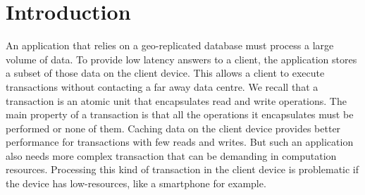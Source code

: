 \documentclass[11pt]{article}
\begin{document}









\newpage
\tableofcontents
\newpage

\section{Introduction}

An application that relies on a geo-replicated database must process a large
volume of data. To provide low latency answers to a client, the application
stores a subset of those data on the client device. This allows a client to
execute transactions without contacting a far away data centre. We recall that
a transaction is an atomic unit that encapsulates read and write operations.
The main property of a transaction is that all the operations it encapsulates
must be performed or none of them. Caching data on the client device provides
better performance for transactions with few reads and writes. But such an
application also needs more complex transaction that can be demanding in
computation resources. Processing this kind of transaction in the client
device is problematic if the device has low-resources, like a smartphone for
example.
\end{document}
